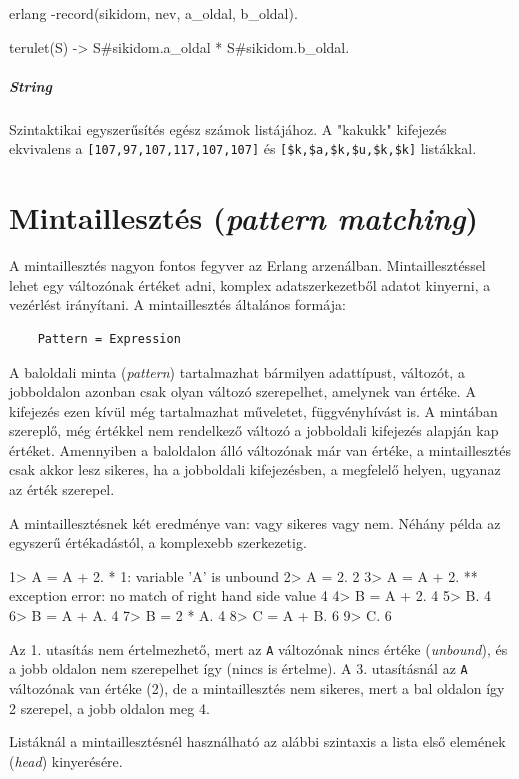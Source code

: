 \documentclass[12pt, a4paper, oneside]{book}
\begin{document}
\begin{code}{erlang}{}
-record(sikidom, { nev, a_oldal, b_oldal}).

terulet(S) ->
  S#sikidom.a_oldal * S#sikidom.b_oldal.
\end{code}

\subparagraph{String} Szintaktikai egyszerűsítés egész számok listájához. A
"kakukk" kifejezés ekvivalens a \texttt{[107,97,107,117,107,107]} és 
\texttt{[\$k,\$a,\$k,\$u,\$k,\$k]} listákkal.

\section{Mintaillesztés (\emph{pattern matching})}
A mintaillesztés nagyon fontos fegyver az Erlang arzenálban. Mintaillesztéssel
lehet egy változónak értéket adni, komplex adatszerkezetből adatot kinyerni,
a vezérlést irányítani. A mintaillesztés általános formája:

\begin{verbatim}
    Pattern = Expression
\end{verbatim}

\noindent A baloldali minta (\emph{pattern}) tartalmazhat bármilyen adattípust,
változót, a jobboldalon azonban csak olyan változó szerepelhet, amelynek van
értéke. A kifejezés ezen kívül még tartalmazhat műveletet, függvényhívást is. A
mintában szereplő, még értékkel nem rendelkező változó a jobboldali kifejezés
alapján kap értéket. Amennyiben a baloldalon álló változónak már van értéke, a
mintaillesztés csak akkor lesz sikeres, ha a jobboldali kifejezésben, a
megfelelő helyen, ugyanaz az érték szerepel.

A mintaillesztésnek két eredménye van: vagy sikeres vagy nem. Néhány példa az
egyszerű értékadástól, a komplexebb szerkezetig.

\begin{code}{}{}
1> A = A + 2.
* 1: variable 'A' is unbound
2> A = 2.
2
3> A = A + 2.
** exception error: no match of right hand side value 4
4> B = A + 2.
4
5> B.
4
6> B = A + A.
4
7> B = 2 * A.
4
8> C = A + B.
6
9> C.
6
\end{code}

\noindent Az 1. utasítás nem értelmezhető, mert az \texttt{A} változónak nincs értéke
(\emph{unbound}), és a jobb oldalon nem szerepelhet így (nincs is értelme). A 3.
utasításnál az \texttt{A} változónak van értéke (2), de a mintaillesztés nem
sikeres, mert a bal oldalon így 2 szerepel, a jobb oldalon meg 4.

Listáknál a mintaillesztésnél használható az alábbi szintaxis a lista első
elemének (\emph{head}) kinyerésére.
\end{document}
